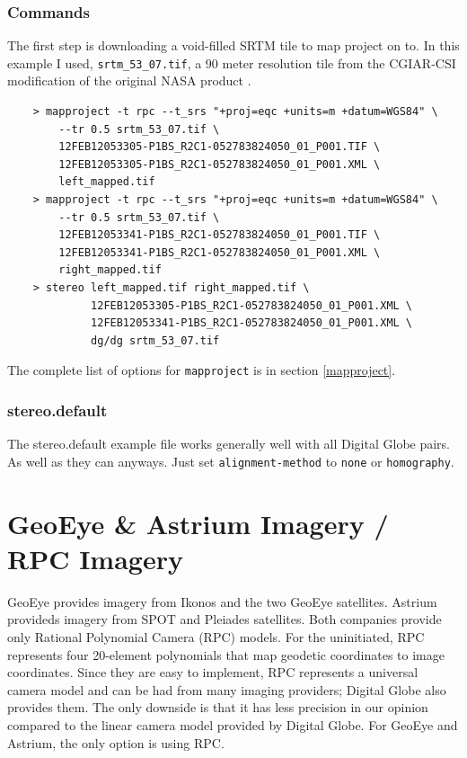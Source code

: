 \subsubsection*{Commands}

The first step is downloading a void-filled SRTM tile to map project
on to. In this example I used, \texttt{srtm\_53\_07.tif}, a 90 meter
resolution tile from the CGIAR-CSI modification of the original NASA
product \cite{cgiar:srtm90m}.

\begin{verbatim}
    > mapproject -t rpc --t_srs "+proj=eqc +units=m +datum=WGS84" \
        --tr 0.5 srtm_53_07.tif \
        12FEB12053305-P1BS_R2C1-052783824050_01_P001.TIF \
        12FEB12053305-P1BS_R2C1-052783824050_01_P001.XML \
        left_mapped.tif
    > mapproject -t rpc --t_srs "+proj=eqc +units=m +datum=WGS84" \
        --tr 0.5 srtm_53_07.tif \
        12FEB12053341-P1BS_R2C1-052783824050_01_P001.TIF \
        12FEB12053341-P1BS_R2C1-052783824050_01_P001.XML \
        right_mapped.tif
    > stereo left_mapped.tif right_mapped.tif \
             12FEB12053305-P1BS_R2C1-052783824050_01_P001.XML \
             12FEB12053341-P1BS_R2C1-052783824050_01_P001.XML \
             dg/dg srtm_53_07.tif
\end{verbatim}

The complete list of options for \texttt{mapproject} is in section
\ref{mapproject}.

\subsubsection*{stereo.default}

The stereo.default example file works generally well with all Digital
Globe pairs. As well as they can anyways. Just set
\texttt{alignment-method} to \texttt{none} or \texttt{homography}.

\newpage
\section{GeoEye \& Astrium Imagery / RPC Imagery}
\label{rpc}

GeoEye provides imagery from Ikonos and the two GeoEye
satellites. Astrium provideds imagery from SPOT and Pleiades
satellites. Both companies provide only Rational Polynomial Camera
(RPC) models. For the uninitiated, RPC represents four 20-element
polynomials that map geodetic coordinates to image coordinates. Since
they are easy to implement, RPC represents a universal camera model
and can be had from many imaging providers; Digital Globe also
provides them. The only downside is that it has less precision in our
opinion compared to the linear camera model provided by Digital
Globe. For GeoEye and Astrium, the only option is using RPC.

